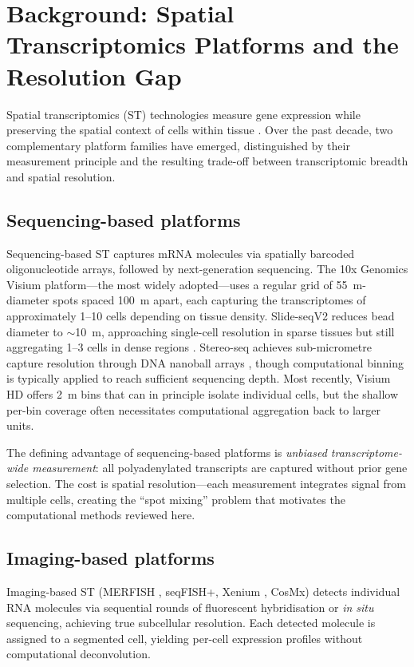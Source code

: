 \section{Background: Spatial Transcriptomics Platforms and the Resolution Gap}
\label{sec:background}

Spatial transcriptomics (ST) technologies measure gene expression while preserving the spatial context of cells within tissue \citep{stahl2016visualization}. Over the past decade, two complementary platform families have emerged, distinguished by their measurement principle and the resulting trade-off between transcriptomic breadth and spatial resolution.

\subsection{Sequencing-based platforms}

Sequencing-based ST captures mRNA molecules via spatially barcoded oligonucleotide arrays, followed by next-generation sequencing. The 10x Genomics Visium platform---the most widely adopted---uses a regular grid of 55~\textmu m-diameter spots spaced 100~\textmu m apart, each capturing the transcriptomes of approximately 1--10 cells depending on tissue density. Slide-seqV2 reduces bead diameter to $\sim$10~\textmu m, approaching single-cell resolution in sparse tissues but still aggregating 1--3 cells in dense regions \citep{stickels2021highly}. Stereo-seq achieves sub-micrometre capture resolution through DNA nanoball arrays \citep{chen2022spatiotemporal}, though computational binning is typically applied to reach sufficient sequencing depth. Most recently, Visium HD offers 2~\textmu m bins that can in principle isolate individual cells, but the shallow per-bin coverage often necessitates computational aggregation back to larger units.

The defining advantage of sequencing-based platforms is \emph{unbiased transcriptome-wide measurement}: all polyadenylated transcripts are captured without prior gene selection. The cost is spatial resolution---each measurement integrates signal from multiple cells, creating the ``spot mixing'' problem that motivates the computational methods reviewed here.

\subsection{Imaging-based platforms}

Imaging-based ST (MERFISH \citep{chen2015spatially}, seqFISH+, Xenium \citep{janesick2023high}, CosMx) detects individual RNA molecules via sequential rounds of fluorescent hybridisation or \emph{in situ} sequencing, achieving true subcellular resolution. Each detected molecule is assigned to a segmented cell, yielding per-cell expression profiles without computational deconvolution.


